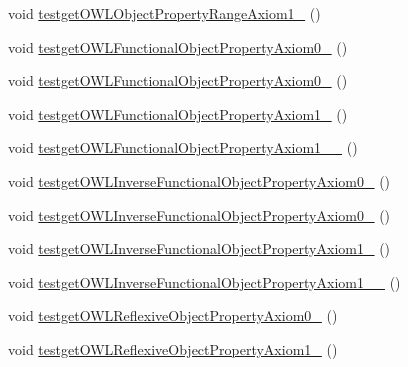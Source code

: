 \begin{DoxyCompactItemize}
void \hyperlink{classorg_1_1semanticweb_1_1owlapi_1_1api_1_1test_1_1_null_check_test_case_a1c9adaa67c60d86b40ec09fa23fc6ee5}{testget\-O\-W\-L\-Object\-Property\-Range\-Axiom1\-\_} ()
\item 
void \hyperlink{classorg_1_1semanticweb_1_1owlapi_1_1api_1_1test_1_1_null_check_test_case_a77101470e2e713d1a93f6331a49a062a}{testget\-O\-W\-L\-Functional\-Object\-Property\-Axiom0\-\_} ()
\item 
void \hyperlink{classorg_1_1semanticweb_1_1owlapi_1_1api_1_1test_1_1_null_check_test_case_acd8b1859f4f88bbe97ce2139a912e91a}{testget\-O\-W\-L\-Functional\-Object\-Property\-Axiom0\-\_} ()
\item 
void \hyperlink{classorg_1_1semanticweb_1_1owlapi_1_1api_1_1test_1_1_null_check_test_case_aad8ef47cec903b5fb201a00bd609817c}{testget\-O\-W\-L\-Functional\-Object\-Property\-Axiom1\-\_} ()
\item 
void \hyperlink{classorg_1_1semanticweb_1_1owlapi_1_1api_1_1test_1_1_null_check_test_case_a11023aad76e0cd85635d1b090d5e728d}{testget\-O\-W\-L\-Functional\-Object\-Property\-Axiom1\-\_\-\_} ()
\item 
void \hyperlink{classorg_1_1semanticweb_1_1owlapi_1_1api_1_1test_1_1_null_check_test_case_a2e99ff7e3948abf6be60fb0c0320a5d0}{testget\-O\-W\-L\-Inverse\-Functional\-Object\-Property\-Axiom0\-\_} ()
\item 
void \hyperlink{classorg_1_1semanticweb_1_1owlapi_1_1api_1_1test_1_1_null_check_test_case_a3963bbde1aa531e40c5570cd3d25b199}{testget\-O\-W\-L\-Inverse\-Functional\-Object\-Property\-Axiom0\-\_} ()
\item 
void \hyperlink{classorg_1_1semanticweb_1_1owlapi_1_1api_1_1test_1_1_null_check_test_case_a3a4d39d77300f9a38b529071224bc7c8}{testget\-O\-W\-L\-Inverse\-Functional\-Object\-Property\-Axiom1\-\_} ()
\item 
void \hyperlink{classorg_1_1semanticweb_1_1owlapi_1_1api_1_1test_1_1_null_check_test_case_a8b2674c408a47347c662e3e2b0a595ee}{testget\-O\-W\-L\-Inverse\-Functional\-Object\-Property\-Axiom1\-\_\-\_} ()
\item 
void \hyperlink{classorg_1_1semanticweb_1_1owlapi_1_1api_1_1test_1_1_null_check_test_case_ab38ec16fcb9dc88510d82a03d97fe590}{testget\-O\-W\-L\-Reflexive\-Object\-Property\-Axiom0\-\_} ()
\item 
void \hyperlink{classorg_1_1semanticweb_1_1owlapi_1_1api_1_1test_1_1_null_check_test_case_a5e52a9dae70f016bb1c73951a7f886d3}{testget\-O\-W\-L\-Reflexive\-Object\-Property\-Axiom1\-\_} ()

\end{DoxyCompactItemize}
